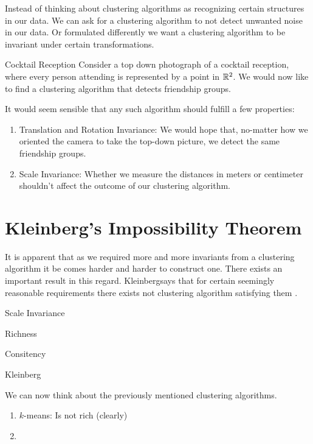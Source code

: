 Instead of thinking about clustering algorithms as recognizing certain structures in our data. We can ask for a clustering algorithm to not detect unwanted noise in our data. Or formulated differently we want a clustering algorithm to be invariant under certain transformations.

\begin{example}{Cocktail Reception}{}
Consider a top down photograph of a cocktail reception, where every person attending is represented by a point in $\mathbb R^2$. We would now like to find a clustering algorithm that detects friendship groups.

It would seem sensible that any such algorithm should fulfill a few properties:

\begin{enumerate}
    \item Translation and Rotation Invariance: We would hope that, no-matter how we oriented the camera to take the top-down picture, we detect the same friendship groups.
    \item Scale Invariance: Whether we measure the distances in meters or centimeter shouldn't affect the outcome of our clustering algorithm.
\end{enumerate}
\end{example}

\section{Kleinberg's Impossibility Theorem}
It is apparent that as we required more and more invariants from a clustering algorithm it be comes harder and harder to construct one.
There exists an important result in this regard. Kleinbergsays that for certain seemingly reasonable requirements there exists not clustering algorithm satisfying them \cite{Kleinberg2002}.

\begin{definition}{Scale Invariance}{}
\end{definition}

\begin{definition}{Richness}{}
\end{definition}

\begin{definition}{Consitency}{}
\end{definition}

\begin{theorem}{Kleinberg \cite{Kleinberg2002}}{}
\source
\end{theorem}

We can now think about the previously mentioned clustering algorithms.

\begin{enumerate}
    \item $k$-means: Is not rich (clearly)
    \item
\end{enumerate}